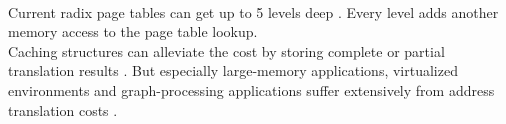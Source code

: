 \\
Current radix page tables can get up to 5 levels deep \cite{intel5LevelPaging5Level2017}. Every level
adds another memory access to the page table lookup.\\
Caching structures can alleviate the cost by storing complete or partial translation results \cite{van2002memory}.
But especially large-memory applications, virtualized environments and graph-processing applications
suffer extensively from address translation costs \cite{zagieboylo2020cost}.
